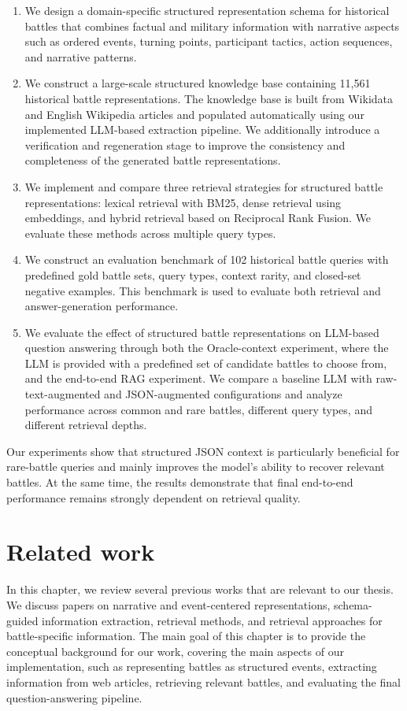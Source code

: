\begin{enumerate}
    \item We design a domain-specific structured representation schema for historical battles that combines factual and military information with narrative aspects such as ordered events, turning points, participant tactics, action sequences, and narrative patterns.

    \item We construct a large-scale structured knowledge base containing 11,561 historical battle representations. The knowledge base is built from Wikidata and English Wikipedia articles and populated automatically using our implemented LLM-based extraction pipeline. We additionally introduce a verification and regeneration stage to improve the consistency and completeness of the generated battle representations.

    \item We implement and compare three retrieval strategies for structured battle representations: lexical retrieval with BM25, dense retrieval using embeddings, and hybrid retrieval based on Reciprocal Rank Fusion. We evaluate these methods across multiple query types.

    \item We construct an evaluation benchmark of 102 historical battle queries with predefined gold battle sets, query types, context rarity, and closed-set negative examples. This benchmark is used to evaluate both retrieval and answer-generation performance.

    \item We evaluate the effect of structured battle representations on LLM-based question answering through both the Oracle-context experiment, where the LLM is provided with a predefined set of candidate battles to choose from, and the end-to-end RAG experiment. We compare a baseline LLM with raw-text-augmented and JSON-augmented configurations and analyze performance across common and rare battles, different query types, and different retrieval depths.
\end{enumerate}
Our experiments show that structured JSON context is particularly beneficial for rare-battle queries and mainly improves the model’s ability to recover relevant battles. At the same time, the results demonstrate that final end-to-end performance remains strongly dependent on retrieval quality.

\chapter{Related work}
In this chapter, we review several previous works that are relevant to our thesis. We discuss papers on narrative and event-centered representations, schema-guided information extraction, retrieval methods, and retrieval approaches for battle-specific information. The main goal of this chapter is to provide the conceptual background for our work, covering the main aspects of our implementation, such as representing battles as structured events, extracting information from web articles, retrieving relevant battles, and evaluating the final question-answering pipeline.

